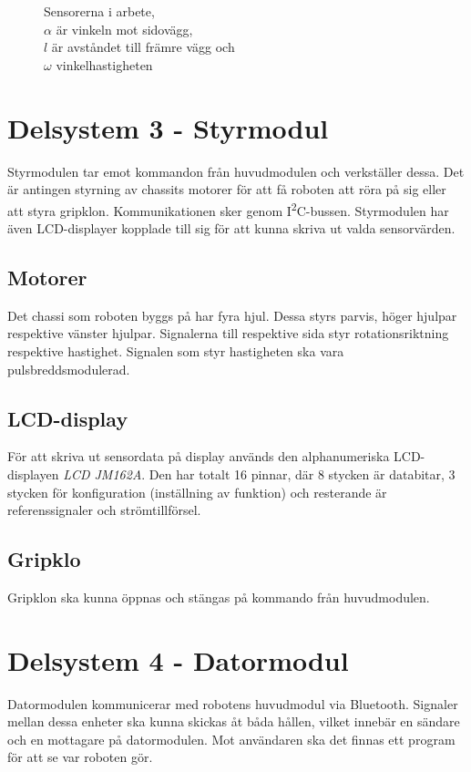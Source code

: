 \documentclass[11pt]{article}
\begin{document}
\begin{flushleft}
\begin{figure}[htbp]
\centering

\noindent\resizebox{.5\textwidth}{!}{
	}
	\captionsetup{justification=centering}
	\caption{Sensorerna i arbete, \\ $\alpha$ är vinkeln mot sidovägg, \\ $l$ är avståndet till främre vägg och \\ $\omega$ vinkelhastigheten}
	\label{measurements}
\end{figure}
\pagebreak
\section{Delsystem 3 - Styrmodul}
Styrmodulen tar emot kommandon från huvudmodulen och verkställer dessa. Det är antingen styrning av chassits motorer för att få roboten att röra på sig eller att styra gripklon. Kommunikationen sker genom I\textsuperscript{2}C-bussen. Styrmodulen har även LCD-displayer kopplade till sig för att kunna skriva ut valda sensorvärden.
\subsection{Motorer}
Det chassi som roboten byggs på har fyra hjul. Dessa styrs parvis, höger hjulpar respektive vänster hjulpar. Signalerna till respektive sida styr rotationsriktning respektive hastighet. Signalen som styr hastigheten ska vara pulsbreddsmodulerad.
\subsection{LCD-display}
För att skriva ut sensordata på display används den alphanumeriska LCD-displayen \textit{LCD JM162A}. Den har totalt 16 pinnar, där 8 stycken är databitar, 3 stycken för konfiguration (inställning av funktion) och resterande är referenssignaler och strömtillförsel.

\subsection{Gripklo}
Gripklon ska kunna öppnas och stängas på kommando från huvudmodulen. 

\pagebreak
\section{Delsystem 4 - Datormodul}
Datormodulen kommunicerar med robotens huvudmodul via Bluetooth\textsuperscript{\circledR}. Signaler mellan dessa enheter ska kunna skickas åt båda hållen, vilket innebär en sändare och en mottagare på datormodulen. Mot användaren ska det finnas ett program för att se var roboten gör.

\end{flushleft}
\end{document}
